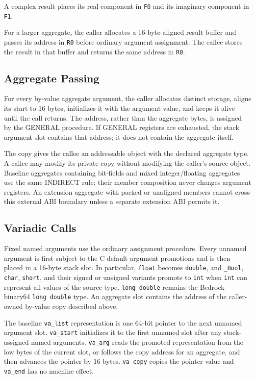 \documentclass[10pt,twoside]{article}
\begin{document}
A complex result places its real component in \texttt{F0} and its imaginary
component in \texttt{F1}.

For a larger aggregate, the caller allocates a 16-byte-aligned result buffer
and passes its address in \texttt{R0} before ordinary argument assignment. The
callee stores the result in that buffer and returns the same address in
\texttt{R0}.



\subsection{Aggregate Passing}
For every by-value aggregate argument, the caller allocates distinct storage,
aligns its start to 16 bytes, initializes it with the argument value, and keeps
it alive until the call returns. The address, rather than the aggregate bytes,
is assigned by the GENERAL procedure. If GENERAL registers are exhausted, the
stack argument slot contains that address; it does not contain the aggregate
itself.

The copy gives the callee an addressable object with the declared aggregate
type. A callee may modify its private copy without modifying the caller's
source object. Baseline aggregates containing bit-fields and mixed
integer/floating aggregates use the same INDIRECT rule; their member
composition never changes argument registers. An extension aggregate with
packed or unaligned members cannot cross this external ABI boundary unless a
separate extension ABI permits it.

\subsection{Variadic Calls}
Fixed named arguments use the ordinary assignment procedure. Every unnamed
argument is first subject to the C default argument promotions and is then
placed in a 16-byte stack slot. In particular, \texttt{float} becomes
\texttt{double}, and \texttt{\_Bool}, \texttt{char}, \texttt{short}, and their
signed or unsigned variants promote to \texttt{int} when \texttt{int} can
represent all values of the source type. \texttt{long double} remains the
Bedrock binary64 \texttt{long double} type. An aggregate slot contains the
address of the caller-owned by-value copy described above.

The baseline \texttt{va\_list} representation is one 64-bit pointer to the next
unnamed argument slot. \texttt{va\_start} initializes it to the first unnamed
slot after any stack-assigned named arguments. \texttt{va\_arg} reads the
promoted representation from the low bytes of the current slot, or follows the
copy address for an aggregate, and then advances the pointer by 16 bytes.
\texttt{va\_copy} copies the pointer value and \texttt{va\_end} has no machine
effect.
\end{document}
